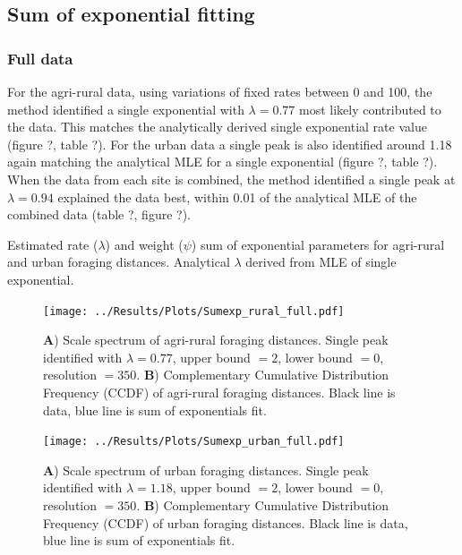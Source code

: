 \documentclass[11pt,usenames,dvipsnames]{article}
\begin{document}
\subsection{Sum of exponential fitting}

\subsubsection{Full data}

For the agri-rural data, using variations of fixed rates between 0 and 100, the method identified a single exponential with $\lambda = 0.77$ most likely contributed to the data. This matches the analytically derived single exponential rate value (figure ?, table ?). For the urban data a single peak is also identified around 1.18 again matching the analytical MLE for a single exponential (figure ?, table ?). When the data from each site is combined, the method identified a single peak at $\lambda = 0.94$ explained the data best, within 0.01 of the analytical MLE of the combined data (table ?, figure ?). 

\begin{table}[H]
	\centering
	\caption{Estimated rate ($\lambda$) and weight ($\psi$) sum of exponential parameters for agri-rural and urban foraging distances. Analytical $\lambda$ derived from MLE of single exponential.}
	
\end{table}


\begin{figure}[H]
	\centering
	\texttt{[image: ../Results/Plots/Sumexp\_rural\_full.pdf]}
	\caption{\textbf{A}) Scale spectrum of agri-rural foraging distances. Single peak identified with $\lambda = 0.77$, upper bound $= 2$, lower bound $= 0$, resolution $= 350$. \textbf{B}) Complementary Cumulative Distribution Frequency (CCDF) of agri-rural foraging distances. Black line is data, blue line is sum of exponentials fit.}
\end{figure}

\begin{figure}[H]
	\centering
	\texttt{[image: ../Results/Plots/Sumexp\_urban\_full.pdf]}
	\caption{\textbf{A}) Scale spectrum of urban foraging distances. Single peak identified with $\lambda = 1.18$, upper bound $= 2$, lower bound $= 0$, resolution $= 350$. \textbf{B}) Complementary Cumulative Distribution Frequency (CCDF) of urban foraging distances. Black line is data, blue line is sum of exponentials fit.}
\end{figure}
\end{document}
